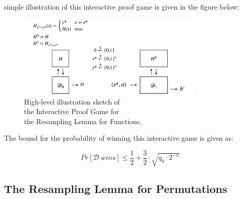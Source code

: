 \documentclass[12pt]{article}
\begin{document}
    \clearpage
    
    \noindent simple illustration of this interactive proof game is given in the figure below:
    
    \begin{figure}[ht]
        \captionsetup{justification=centering}
        \centering
        
        \includegraphics[width=0.8\textwidth]{figures/images/img-7.pdf}
        \caption{High-level illustration sketch of\\ the Interactive Proof Game for\\ the Resampling Lemma for Functions.}
    \end{figure}
    
    
    \noindent The bound for the probability of winning this interactive game is given as:

    $$ Pr[\mathcal{D}\ wins] \leq \frac{1}{2} + \frac{3}{2} \cdot \sqrt{{q}_{0} \cdot {2}^{-n}} $$

    \vspace{4ex}
        
    \subsection{The Resampling Lemma for Permutations}
    \label{subsec:resampling-lemma-permutations}
\end{document}
